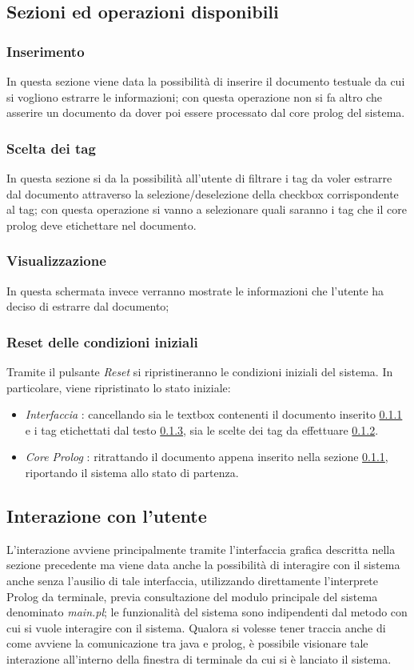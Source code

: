 \subsection{Sezioni ed operazioni disponibili}
    \subsubsection{Inserimento}
    \label{Inserimento}
    In questa sezione viene data la possibilità di inserire il documento testuale da cui si vogliono estrarre le informazioni; con questa operazione non si fa altro che asserire un documento da dover poi essere processato dal core prolog del sistema.
    \subsubsection{Scelta dei tag}
    \label{ChoiceTag}
    In questa sezione si da la possibilità all'utente di filtrare i tag da voler estrarre dal documento attraverso la selezione/deselezione della checkbox corrispondente al tag; con questa operazione si vanno a selezionare quali saranno i tag che il core prolog deve etichettare nel documento.
    \subsubsection{Visualizzazione}
    \label{Visualization}
    In questa schermata invece verranno mostrate le informazioni che l'utente ha deciso di estrarre dal documento;
    
    \subsubsection{Reset delle condizioni iniziali}
    Tramite il pulsante \emph{Reset} si ripristineranno le condizioni iniziali del sistema. In particolare, viene ripristinato lo stato iniziale:
    \begin{itemize}
      \item \emph{Interfaccia} : cancellando sia le textbox contenenti il documento inserito \ref{Inserimento} e i tag etichettati dal testo \ref{Visualization}, sia le scelte dei tag da effettuare \ref{ChoiceTag}.
      \item \emph{Core Prolog} : ritrattando il documento appena inserito nella sezione \ref{Inserimento}, riportando il sistema allo stato di partenza.
    \end{itemize}
    
\subsection{Interazione con l'utente}
L’interazione avviene principalmente tramite l'interfaccia grafica descritta nella sezione precedente ma viene data anche la possibilità di interagire con il sistema anche senza l'ausilio di tale interfaccia, utilizzando direttamente l'interprete Prolog da terminale, previa consultazione del modulo principale del sistema denominato \emph{main.pl}; le funzionalità del sistema sono indipendenti dal metodo con cui si vuole interagire con il  sistema. Qualora si volesse tener traccia anche di come avviene la comunicazione tra java e prolog, è possibile visionare tale interazione all'interno della finestra di terminale da cui si è lanciato il sistema.
